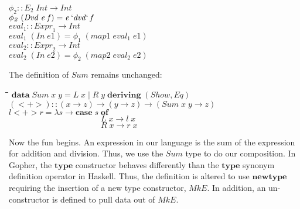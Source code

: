 \documentclass[10pt]{article}
\newlength{\lwidth}\setlength{\lwidth}{4.5cm}
\newlength{\cwidth}\setlength{\cwidth}{8mm} %
\newcommand{\Conid}[1]{\mathit{#1}}
\newcommand{\Varid}[1]{\mathit{#1}}
\begin{document}
\begin{tabbing}
${}$\\
${\Varid{\phi_2}\mathbin{::}\Varid{E}_2\;\Conid{Int}\to \Conid{Int}}$\\
${\Varid{\phi_2}\;(\Conid{Dvd}\;\Varid{e}\;\Varid{f})\mathrel{=}\Varid{e}\mathbin{`\Varid{dvd}`}\Varid{f}}$\\
${}$\\
${\Varid{eval}_1\mathbin{::}\Varid{Expr}_1\to \Conid{Int}}$\\
${\Varid{eval}_1\;(\Conid{In}\;\Varid{e1})\mathrel{=}\Varid{\phi_1}\;(\Varid{map1}\;\Varid{eval}_1\;\Varid{e1})}$\\
${}$\\
${\Varid{eval}_2\mathbin{::}\Varid{Expr}_2\to \Conid{Int}}$\\
${\Varid{eval}_2\;(\Conid{In}\;\Varid{e2})\mathrel{=}\Varid{\phi_2}\;(\Varid{map2}\;\Varid{eval}_2\;\Varid{e2})}$
\end{tabbing}
The definition of \ensuremath{\Conid{Sum}} remains unchanged:

\begin{tabbing}
\qquad\=\hspace{\lwidth}\=\hspace{\cwidth}\=\+\kill
${\mathbf{data}\;\Conid{Sum}\;\Varid{x}\;\Varid{y}\mathrel{=}\Conid{L}\;\Varid{x}\mid \Conid{R}\;\Varid{y}\;\mathbf{deriving}\;(\Conid{Show},\Conid{Eq})}$\\
${}$\\
${(\mathbin{<+>})\mathbin{::}(\Varid{x}\to \Varid{z})\to (\Varid{y}\to \Varid{z})\to (\Conid{Sum}\;\Varid{x}\;\Varid{y}\to \Varid{z})}$\\
${\Varid{l}\mathbin{<+>}\Varid{r}\mathrel{=}\lambda \Varid{s}\to \mathbf{case}\;\Varid{s}\;\mathbf{of}}$\\
${\phantom{\Varid{l}\mathbin{<+>}\Varid{r}\mathrel{=}\lambda \Varid{s}\to \mathbf{case}\;\Varid{s}\;\mbox{}}\Conid{L}\;\Varid{x}\to \Varid{l}\;\Varid{x}}$\\
${\phantom{\Varid{l}\mathbin{<+>}\Varid{r}\mathrel{=}\lambda \Varid{s}\to \mathbf{case}\;\Varid{s}\;\mbox{}}\Conid{R}\;\Varid{x}\to \Varid{r}\;\Varid{x}}$
\end{tabbing}
Now the fun begins.  An expression in our language is the sum of the
expression for addition and division.  Thus, we use the \ensuremath{\Conid{Sum}} type to
do our composition.  In Gopher, the \ensuremath{\mathbf{type}} constructor behaves
differently than the \ensuremath{\mathbf{type}} synonym definition operator in Haskell.
Thus, the definition is altered to use \ensuremath{\mathbf{newtype}} requiring the
insertion of a new type constructor, \ensuremath{\Conid{MkE}}.  In addition, an
un-constructor is defined to pull data out of \ensuremath{\Conid{MkE}}.
\end{document}
